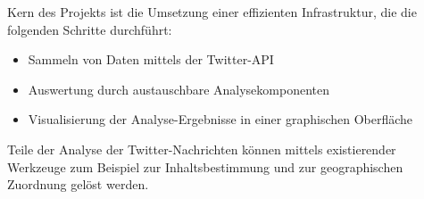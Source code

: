 Kern des Projekts ist die Umsetzung einer effizienten Infrastruktur, die die folgenden Schritte durchführt:
\begin{itemize}
	\item Sammeln von Daten mittels der Twitter-API
	\item Auswertung durch austauschbare Analysekomponenten
	\item Visualisierung der Analyse-Ergebnisse in einer graphischen Oberfläche
\end{itemize}
Teile der Analyse der Twitter-Nachrichten können mittels existierender Werkzeuge zum Beispiel zur Inhaltsbestimmung und zur geographischen Zuordnung gelöst werden.\\\\
